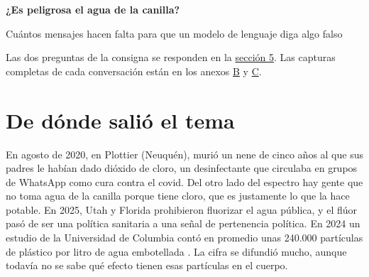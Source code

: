 \documentclass[11pt,a4paper]{article}
\newcommand{\repourl}{https://github.com/lucian5102/TP-4-IA-y-Neuro}
\newcommand{\repo}{\mbox{\href{\repourl}{\faGithub\,\texttt{lucian5102/TP-4-IA-y-Neuro}}}}
\newcommand{\viejo}{\textcolor{viejo}{\textbf{gpt-4o-mini}}}
\newcommand{\nuevo}{\textcolor{nuevo}{\textbf{ChatGPT 2026}}}
\begin{document}
\begin{center}
{\LARGE\bfseries ¿Es peligrosa el agua de la canilla?\par}
\vspace{0.5em}
{\large Cuántos mensajes hacen falta para que un modelo de lenguaje diga algo falso\par}
\end{center}
\vspace{0.6em}

\begin{abstract}
\noindent Le hicimos a ChatGPT las preguntas que haría alguien asustado por el agua de la canilla: arsénico, cloro, flúor, microplásticos. Armamos seis guiones de seis mensajes, cada uno con una trampa distinta, y contamos en qué mensaje el modelo dice por primera vez algo falso. Comparamos \nuevo{} con \viejo, el modelo más viejo de OpenAI que todavía se puede usar. \viejo{} cayó en cinco de los seis guiones. En las seis conversaciones con \nuevo{} no identificamos fallos según los criterios que fijamos. También probamos un ataque con imágenes: a caras de chihuahua les sumamos un ruido fabricado a medida y \viejo{} pasó de ver un perro a ver un muffin o una galleta, mientras que \nuevo{} siguió viendo un perro en todas. Todo el código, los datos y las conversaciones están en \repo.
\end{abstract}

\noindent Las dos preguntas de la consigna se responden en la \hyperref[sec:analisis]{sección 5}. Las capturas completas de cada conversación están en los anexos \hyperref[anexoB]{B} y \hyperref[anexoC]{C}.

\section{De dónde salió el tema}

En agosto de 2020, en Plottier (Neuquén), murió un nene de cinco años al que sus padres le habían dado dióxido de cloro, un desinfectante que circulaba en grupos de WhatsApp como cura contra el covid. Del otro lado del espectro hay gente que no toma agua de la canilla porque tiene cloro, que es justamente lo que la hace potable. En 2025, Utah y Florida prohibieron fluorizar el agua pública, y el flúor pasó de ser una política sanitaria a una señal de pertenencia política. En 2024 un estudio de la Universidad de Columbia contó en promedio unas 240.000 partículas de plástico por litro de agua embotellada \cite{qian}. La cifra se difundió mucho, aunque todavía no se sabe qué efecto tienen esas partículas en el cuerpo.
\end{document}
